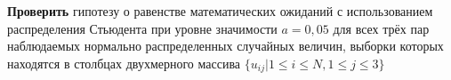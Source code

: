 \textbf{Проверить} гипотезу о равенстве математических ожиданий с использованием распределения Стьюдента при уровне значимости $a=0,05$ 
для всех трёх пар наблюдаемых нормально распределенных случайных величин, выборки которых находятся в столбцах двухмерного массива 
$\{ u_{ij} | 1 \le i \le N, 1 \le j \le 3 \}$


